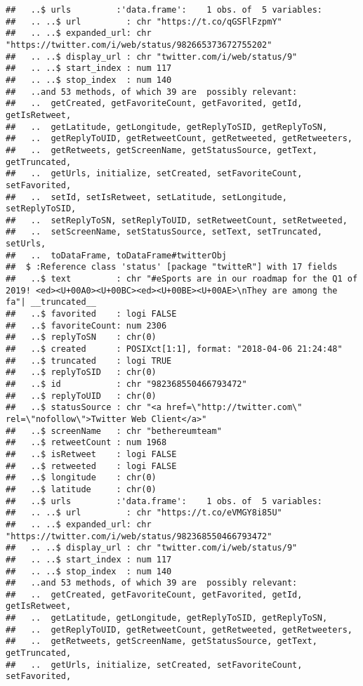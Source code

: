 \documentclass[]{article}
\begin{document}
\begin{verbatim}
##   ..$ urls         :'data.frame':    1 obs. of  5 variables:
##   .. ..$ url         : chr "https://t.co/qGSFlFzpmY"
##   .. ..$ expanded_url: chr "https://twitter.com/i/web/status/982665373672755202"
##   .. ..$ display_url : chr "twitter.com/i/web/status/9"
##   .. ..$ start_index : num 117
##   .. ..$ stop_index  : num 140
##   ..and 53 methods, of which 39 are  possibly relevant:
##   ..  getCreated, getFavoriteCount, getFavorited, getId, getIsRetweet,
##   ..  getLatitude, getLongitude, getReplyToSID, getReplyToSN,
##   ..  getReplyToUID, getRetweetCount, getRetweeted, getRetweeters,
##   ..  getRetweets, getScreenName, getStatusSource, getText, getTruncated,
##   ..  getUrls, initialize, setCreated, setFavoriteCount, setFavorited,
##   ..  setId, setIsRetweet, setLatitude, setLongitude, setReplyToSID,
##   ..  setReplyToSN, setReplyToUID, setRetweetCount, setRetweeted,
##   ..  setScreenName, setStatusSource, setText, setTruncated, setUrls,
##   ..  toDataFrame, toDataFrame#twitterObj
##  $ :Reference class 'status' [package "twitteR"] with 17 fields
##   ..$ text         : chr "#eSports are in our roadmap for the Q1 of 2019! <ed><U+00A0><U+00BC><ed><U+00BE><U+00AE>\nThey are among the fa"| __truncated__
##   ..$ favorited    : logi FALSE
##   ..$ favoriteCount: num 2306
##   ..$ replyToSN    : chr(0) 
##   ..$ created      : POSIXct[1:1], format: "2018-04-06 21:24:48"
##   ..$ truncated    : logi TRUE
##   ..$ replyToSID   : chr(0) 
##   ..$ id           : chr "982368550466793472"
##   ..$ replyToUID   : chr(0) 
##   ..$ statusSource : chr "<a href=\"http://twitter.com\" rel=\"nofollow\">Twitter Web Client</a>"
##   ..$ screenName   : chr "bethereumteam"
##   ..$ retweetCount : num 1968
##   ..$ isRetweet    : logi FALSE
##   ..$ retweeted    : logi FALSE
##   ..$ longitude    : chr(0) 
##   ..$ latitude     : chr(0) 
##   ..$ urls         :'data.frame':    1 obs. of  5 variables:
##   .. ..$ url         : chr "https://t.co/eVMGY8i85U"
##   .. ..$ expanded_url: chr "https://twitter.com/i/web/status/982368550466793472"
##   .. ..$ display_url : chr "twitter.com/i/web/status/9"
##   .. ..$ start_index : num 117
##   .. ..$ stop_index  : num 140
##   ..and 53 methods, of which 39 are  possibly relevant:
##   ..  getCreated, getFavoriteCount, getFavorited, getId, getIsRetweet,
##   ..  getLatitude, getLongitude, getReplyToSID, getReplyToSN,
##   ..  getReplyToUID, getRetweetCount, getRetweeted, getRetweeters,
##   ..  getRetweets, getScreenName, getStatusSource, getText, getTruncated,
##   ..  getUrls, initialize, setCreated, setFavoriteCount, setFavorited,

\end{verbatim}
\end{document}
